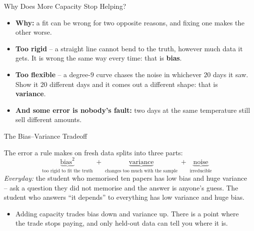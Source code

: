 \begin{frame}{Why Does More Capacity Stop Helping?}
\begin{itemize}
  \item \textbf{Why:} a fit can be wrong for two opposite reasons, and fixing one makes the other worse.
  \pause
  \item \textbf{Too rigid} -- a straight line cannot bend to the truth, however much data it gets. It is wrong the same way every time: that is \textbf{bias}.
  \pause
  \item \textbf{Too flexible} -- a degree-$9$ curve chases the noise in whichever $20$ days it saw. Show it $20$ different days and it comes out a different shape: that is \textbf{variance}.
  \pause
  \item \textbf{And some error is nobody's fault:} two days at the same temperature still sell different amounts.
\end{itemize}
\end{frame}

\begin{frame}{The Bias--Variance Tradeoff}
\begin{rldefinition}
The error a rule makes on fresh data splits into three parts:
\[
\underbrace{\text{bias}^2}_{\text{too rigid to fit the truth}}
\; + \;
\underbrace{\text{variance}}_{\text{changes too much with the sample}}
\; + \;
\underbrace{\text{noise}}_{\text{irreducible}}
\]
\emph{Everyday:} the student who memorised ten papers has low bias and huge variance -- ask a question they did not memorise and the answer is anyone's guess. The student who answers ``it depends'' to everything has low variance and huge bias.
\end{rldefinition}
\pause
\begin{itemize}
  \item Adding capacity trades bias down and variance up. There is a point where the trade stops paying, and only held-out data can tell you where it is.
\end{itemize}
\end{frame}

